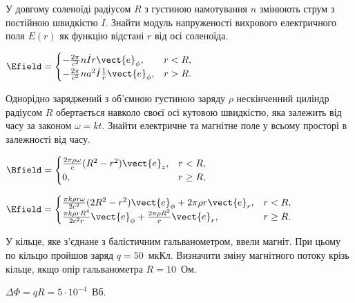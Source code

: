 \begin{problem}
У довгому соленоїді радіусом $R$ з густиною намотування $n$ змінюють струм з постійною швидкістю $\dot{I}$. Знайти модуль напруженості вихрового електричного поля $E(r)$ як функцію відстані $r$ від осі соленоїда.
\begin{solution}
	$
		\Efield =
		\begin{cases}
			- \frac{2\pi}{c^2} n\dot{I} r\vect{e}_{\phi},               & r < R, \\
			- \frac{2\pi}{c^2} n a^2\dot{I} \frac{1}{r}\vect{e}_{\phi}, & r > R.
		\end{cases}
	$
\end{solution}
\end{problem}

\begin{problem}
Однорідно заряджений з об'ємною густиною заряду $\rho$ нескінченний циліндр радіусом $R$ обертається навколо своєї осі кутовою швидкістю, яка залежить від часу за законом $\omega = kt$. Знайти електричне та магнітне поле у всьому просторі в залежності від часу.
\begin{solution}
	$
		\Bfield =
		\begin{cases}
			\frac{2\pi\rho\omega}{c}(R^2 - r^2)\vect{e}_z, & r< R,    \\
			0,                                             & r \ge R,
		\end{cases}
	$

	$
		\Efield =
		\begin{cases}
			\frac{\pi k \rho r\omega}{2c^2}(2R^2 - r^2)\vect{e}_{\phi} + 2\pi\rho r \vect{e}_r, & r< R,    \\
			\frac{\pi k \rho r R^4}{2c^2r}\vect{e}_{\phi} + \frac{2\pi \rho R^2}{r}\vect{e}_r,  & r \ge R.
		\end{cases}
	$
\end{solution}
\end{problem}

\begin{problem}%
    У кільце, яке з'єднане з балістичним гальванометром, ввели магніт. При цьому по кільцю пройшов заряд $q = 50$~мкКл. Визначити зміну магнітного потоку крізь кільце, якщо опір гальванометра $R = 10$~Ом.
    \begin{solution}
    $\Delta\Phi = qR = 5\cdot10^{-4}$~Вб.
    \end{solution}
\end{problem}

